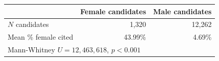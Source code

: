 \begin{tabular}{lrr}
    \toprule
    & Female candidates & Male candidates \\
    \midrule
    $N$ candidates & 1,320 & 12,262 \\
    Mean \% female cited & 43.99\% & 4.69\% \\
    \midrule
    \multicolumn{3}{l}{Mann-Whitney $U = 12{,}463{,}618$, $p < 0.001$} \\
    \bottomrule
\end{tabular}